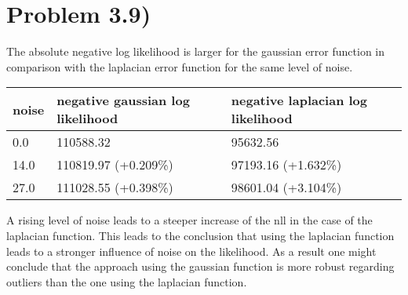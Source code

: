\documentclass[11pt]{article} %
\begin{document}
 	\section*{Problem 3.9)}
 	The absolute negative log likelihood is larger for the gaussian error function in comparison with the laplacian error function for the same level of noise.\\
 	\begin{center}
 	\begin{tabular}{ | l | l | l | }
 		\hline
 		noise  & negative gaussian log likelihood & negative laplacian log likelihood \\ \hline
 		0.0 & 110588.32 & 95632.56 \\ \hline   
 		14.0 & 110819.97 (+0.209\%) & 97193.16 (+1.632\%) \\ \hline
  		27.0 & 111028.55 (+0.398\%) & 98601.04 (+3.104\%) \\ \hline
 	\end{tabular}
 	\end{center}
 	A rising level of noise leads to a steeper increase of the nll in the case of the laplacian function. This leads to the conclusion that using the laplacian function leads to a stronger influence of noise on the likelihood.
 	As a result one might conclude that the approach using the gaussian function is more robust regarding outliers than the one using the laplacian function.
	
\end{document}
